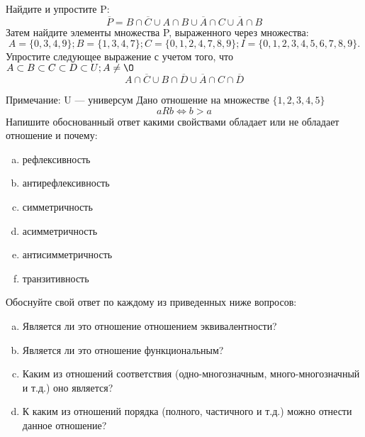 \documentclass[10pt]{exam}
\begin{document}
\begin{questions}
\question
Найдите и упростите P:
\begin{equation*}
\overline{P} = B \cap \overline{C} \cup A \cap B \cup \overline{A} \cap C \cup \overline{A} \cap B
\end{equation*}
Затем найдите элементы множества P, выраженного через множества:
\begin{equation*}
A = \{0, 3, 4, 9\}; 
B = \{1, 3, 4, 7\};
C = \{0, 1, 2, 4, 7, 8, 9\};
I = \{0, 1, 2, 3, 4, 5, 6, 7, 8, 9\}.
\end{equation*}\question
Упростите следующее выражение с учетом того, что $A\subset B \subset C \subset D \subset U; A \neq \O$
\begin{equation*}
A \cap  \overline{C} \cup B \cap \overline{D} \cup  \overline{A} \cap C \cap  \overline{D}
\end{equation*}

Примечание: U — универсум\question
Дано отношение на множестве $\{1, 2, 3, 4, 5\}$ 
\begin{equation*}
aRb \iff b > a
\end{equation*}
Напишите обоснованный ответ какими свойствами обладает или не обладает отношение и почему:   
\begin{enumerate} [a)]\setcounter{enumi}{0}
\item рефлексивность
\item антирефлексивность
\item симметричность
\item асимметричность
\item антисимметричность
\item транзитивность
\end{enumerate}

Обоснуйте свой ответ по каждому из приведенных ниже вопросов:
\begin{enumerate} [a)]\setcounter{enumi}{0}
    \item Является ли это отношение отношением эквивалентности?
    \item Является ли это отношение функциональным?
    \item Каким из отношений соответствия (одно-многозначным, много-многозначный и т.д.) оно является?
    \item К каким из отношений порядка (полного, частичного и т.д.) можно отнести данное отношение?
\end{enumerate}


\end{questions}
\end{document}
